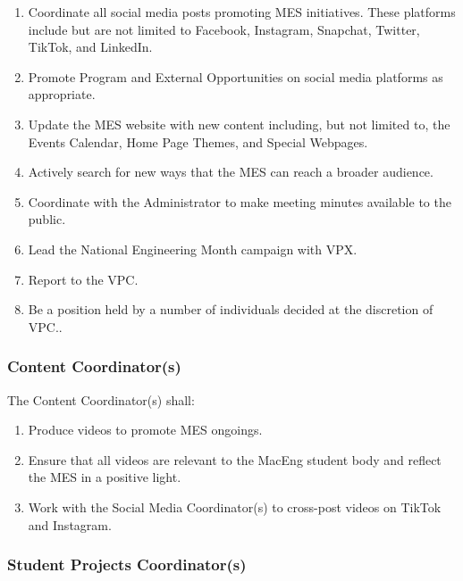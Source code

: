 \begin{enumerate}
 \item
  Coordinate all social media posts promoting MES initiatives. These platforms include but are not limited to Facebook, Instagram, Snapchat, Twitter, TikTok, and LinkedIn.
 \item
  Promote Program and External Opportunities on social media platforms as appropriate.
 \item
  Update the MES website with new content including, but not limited to, the Events Calendar, Home Page Themes, and Special Webpages.
 \item
  Actively search for new ways that the MES can reach a broader audience.
 \item
  Coordinate with the Administrator to make meeting minutes available to the public.
 \item
  Lead the National Engineering Month campaign with VPX.
 \item
  Report to the VPC.
 \item
  Be a position held by a number of individuals decided at the discretion of VPC..

\end{enumerate}

\subsubsection{Content Coordinator(s)}
\label{content-coordinators}
The Content Coordinator(s) shall:

\begin{enumerate}
 \item Produce videos to promote MES ongoings.
 \item Ensure that all videos are relevant to the MacEng student body and reflect the MES in a positive light.
 \item Work with the Social Media Coordinator(s) to cross-post videos on TikTok and Instagram.
\end{enumerate}

\subsubsection{Student Projects Coordinator(s)}
\label{special-projects-coordinators}

